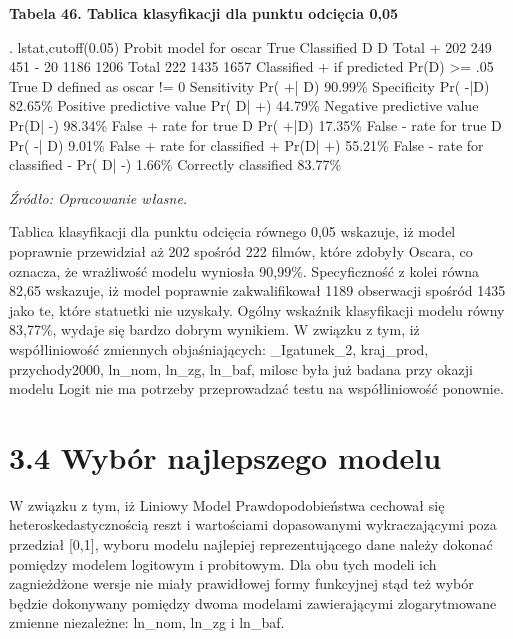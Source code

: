 \vspace{0.5cm}
\textbf{Tabela 46. Tablica klasyfikacji dla punktu odcięcia 0,05}
\begin{stlog}
. lstat,cutoff(0.05)
{\smallskip}
Probit model for oscar
{\smallskip}
               True 
Classified {\VBAR}         D            {\tytilde}D  {\VBAR}      Total
     +     {\VBAR}       202           249  {\VBAR}        451
     -     {\VBAR}        20          1186  {\VBAR}       1206
   Total   {\VBAR}       222          1435  {\VBAR}       1657
{\smallskip}
Classified + if predicted Pr(D) >= .05
True D defined as oscar != 0
Sensitivity                     Pr( +| D)   90.99\%
Specificity                     Pr( -|{\tytilde}D)   82.65\%
Positive predictive value       Pr( D| +)   44.79\%
Negative predictive value       Pr({\tytilde}D| -)   98.34\%
False + rate for true {\tytilde}D        Pr( +|{\tytilde}D)   17.35\%
False - rate for true D         Pr( -| D)    9.01\%
False + rate for classified +   Pr({\tytilde}D| +)   55.21\%
False - rate for classified -   Pr( D| -)    1.66\%
Correctly classified                        83.77\%
\end{stlog}
\textit{\footnotesize{Źródło: Opracowanie własne.}} \\
\vspace{1cm}

Tablica klasyfikacji dla punktu odcięcia równego 0,05 wskazuje, iż model poprawnie przewidział aż 202 spośród 222 filmów, które zdobyły Oscara, co oznacza, że wrażliwość modelu wyniosła 90,99\%. Specyficzność z kolei równa 82,65 wskazuje, iż model poprawnie zakwalifikował 1189 obserwacji spośród 1435 jako te, które statuetki nie uzyskały. Ogólny wskaźnik klasyfikacji modelu równy 83,77\%, wydaje się bardzo dobrym wynikiem. W związku z tym, iż współliniowość zmiennych objaśniających: _Igatunek_2, kraj_prod, przychody2000, ln_nom, ln_zg, ln_baf, milosc była już badana przy okazji modelu Logit nie ma potrzeby przeprowadzać testu na współliniowość ponownie. 

\section*{3.4 Wybór najlepszego modelu}

W związku z tym, iż Liniowy Model Prawdopodobieństwa cechował się heteroskedastycznością reszt i wartościami dopasowanymi wykraczającymi poza przedział [0,1], wyboru modelu najlepiej reprezentującego dane należy dokonać pomiędzy modelem logitowym i probitowym. Dla obu tych modeli ich zagnieżdżone wersje nie miały prawidłowej formy funkcyjnej stąd też wybór będzie dokonywany pomiędzy dwoma modelami zawierającymi zlogarytmowane zmienne niezależne: ln_nom, ln_zg i ln_baf. 

